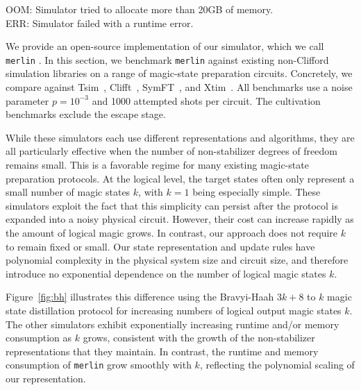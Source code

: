 \begin{table}[t]
    \medskip
    \raggedright
    \footnotesize
    \quad OOM: Simulator tried to allocate more than 20GB of memory. \\
    \quad ERR: Simulator failed with a runtime error.

    \caption{
        Simulation time for 1000 attempted shots of the 15-to-1 magic state distillation \cite{bravyi2005universal}, magic state cultivation without the escape stage \cite{gidney2024magic} and the code switching protocol from Ref. \cite{li2026transversal}.
    }
    \label{tab:other-circuits}
\end{table}

We provide an open-source implementation of our simulator, which we call \texttt{merlin} \cite{koch2026merlin}.
In this section, we benchmark \texttt{merlin} against existing non-Clifford simulation libraries on a range of magic-state preparation circuits.
Concretely, we compare against Tsim~\cite{haenel2026tsim}, Clifft~\cite{chase2026clifft}, SymFT~\cite{fang2026symft}, and Xtim~\cite{surti2026efficient}.
All benchmarks use a noise parameter $p=10^{-3}$ and 1000 attempted shots per circuit.
The cultivation benchmarks exclude the escape stage.

While these simulators each use different representations and algorithms, they are all particularly effective when the number of non-stabilizer degrees of freedom remains small.
This is a favorable regime for many existing magic-state preparation protocols.
At the logical level, the target states often only represent a small number of magic states $k$, with $k = 1$ being especially simple.
These simulators exploit the fact that this simplicity can persist after the protocol is expanded into a noisy physical circuit.
However, their cost can increase rapidly as the amount of logical magic grows.
In contrast, our approach does not require $k$ to remain fixed or small.
Our state representation and update rules have polynomial complexity in the physical system size and circuit size, and therefore introduce no exponential dependence on the number of logical magic states $k$.

Figure~\ref{fig:bh} illustrates this difference using the Bravyi-Haah $3k+8$ to $k$ magic state distillation protocol \cite{bravyi2012magic} for increasing numbers of logical output magic states $k$.
The other simulators exhibit exponentially increasing runtime and/or memory consumption as $k$ grows, consistent with the growth of the non-stabilizer representations that they maintain.
In contrast, the runtime and memory consumption of \texttt{merlin} grow smoothly with $k$, reflecting the polynomial scaling of our representation.

